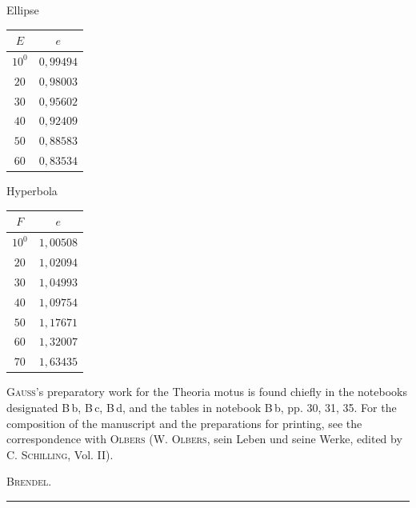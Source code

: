 \begin{center}
\begin{minipage}[t]{.42\linewidth}\centering
Ellipse\par\smallskip
\begin{tabular}{c|c}
$E$ & $e$ \\
\hline
$10^0$ & $0{,}99494$ \\
$20$ & $0{,}98003$ \\
$30$ & $0{,}95602$ \\
$40$ & $0{,}92409$ \\
$50$ & $0{,}88583$ \\
$60$ & $0{,}83534$ \\
\end{tabular}
\end{minipage}\hfill
\begin{minipage}[t]{.42\linewidth}\centering
Hyperbola\par\smallskip
\begin{tabular}{c|c}
$F$ & $e$ \\
\hline
$10^0$ & $1{,}00508$ \\
$20$ & $1{,}02094$ \\
$30$ & $1{,}04993$ \\
$40$ & $1{,}09754$ \\
$50$ & $1{,}17671$ \\
$60$ & $1{,}32007$ \\
$70$ & $1{,}63435$ \\
\end{tabular}
\end{minipage}
\end{center}
\textsc{Gauss}'s preparatory work for the Theoria motus is found chiefly in the notebooks
designated B\,b, B\,c, B\,d, and the tables in notebook B\,b, pp. 30, 31, 35. For the
composition of the manuscript and the preparations for printing, see the correspondence
with \textsc{Olbers} (W. \textsc{Olbers}, sein Leben und seine Werke, edited by C.
\textsc{Schilling}, Vol. II).

\begin{flushright}
\textsc{Brendel}.
\end{flushright}

\begin{center}
\rule{0.3\linewidth}{0.4pt}
\end{center}
